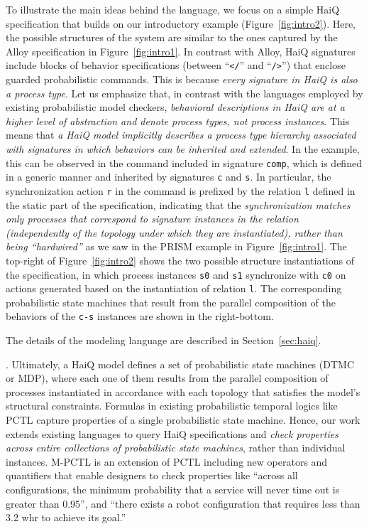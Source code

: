 \documentclass[10pt,journal,compsoc]{IEEEtran}
\begin{document}
To illustrate the main ideas behind the language, we focus on a simple {\sf HaiQ} specification that builds on our introductory example (Figure~\ref{fig:intro2}). Here, the possible structures of the system are similar to the ones captured by the Alloy specification in Figure~\ref{fig:intro1}. 
In contrast with Alloy, {\sf HaiQ} signatures include blocks of behavior specifications (between ``{\tt</}'' and ``{\tt/>}'') that enclose guarded probabilistic commands. 
This is because {\it every signature in {\sf HaiQ} is also a process type}. 
Let us emphasize that, in contrast with the languages employed by existing probabilistic model checkers, {\em behavioral descriptions in {\sf HaiQ} are at a higher level of abstraction and denote process types, not process instances}. 
This means that {\it a {\sf HaiQ} model implicitly describes a process type hierarchy associated with signatures in which behaviors can be inherited and extended}. 
In the example, this can be observed in the command included in signature {\tt comp}, which is defined in a generic manner and inherited by signatures {\tt c} and {\tt s}. 
In particular, the synchronization action {\tt r} in the command is prefixed by the relation {\tt l} defined in the static part of the specification, indicating that the {\it synchronization matches only processes that correspond to signature instances in the relation (independently of the topology under which they are instantiated), rather than being ``hardwired''} as we saw in the PRISM example in Figure~\ref{fig:intro1}. 
The top-right of Figure~\ref{fig:intro2} shows the two possible structure instantiations of the specification, in which process instances {\tt s0} and {\tt s1} synchronize with {\tt c0} on actions generated based on the instantiation of relation {\tt l}. 
The corresponding probabilistic state machines that result from the parallel composition of the behaviors of the {\tt c-s} instances are shown in the right-bottom.

The details of the modeling language are described in Section~\ref{sec:haiq}.

\smallskip
{}. 
Ultimately, a {\sf HaiQ} model defines a set of probabilistic state machines (DTMC or MDP), where each one of them results from the parallel composition of processes instantiated in accordance with each topology that satisfies the model's structural constraints. 
Formulas in existing probabilistic temporal logics like PCTL capture properties of a single probabilistic state machine. 
Hence, our work extends existing languages to query {\sf HaiQ} specifications and {\it check properties across entire collections of probabilistic state machines}, rather than individual instances. 
M-PCTL is an extension of PCTL including new operators and quantifiers that enable designers to check properties like ``across all configurations, the minimum probability that a service will never time out is greater than 0.95'', and ``there exists a robot configuration that requires less than 3.2 whr to achieve its goal.''
\end{document}
